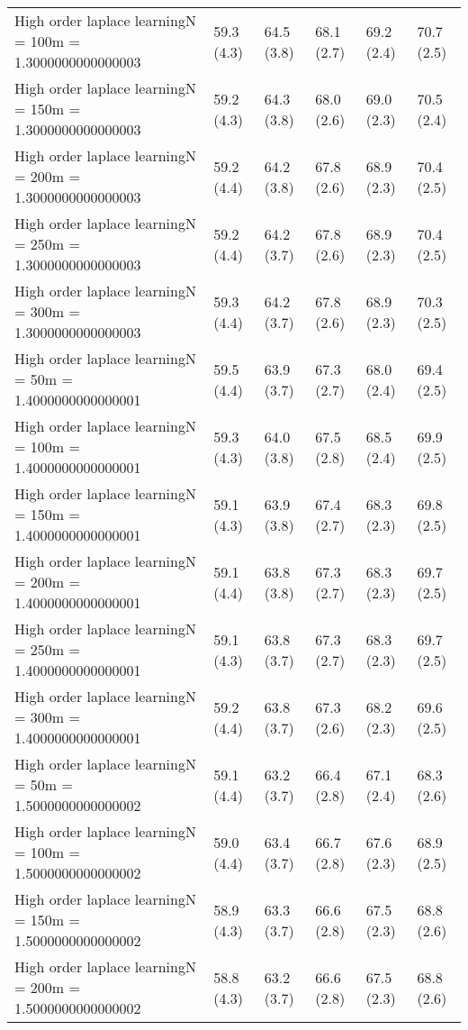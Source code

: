 \documentclass{article}
\begin{document}
\begin{table*}[t!]
\begin{center}
\begin{small}
\begin{sc}
\begin{tabular}{llllll}
High order laplace learningN = 100m = 1.3000000000000003&59.3 (4.3)      &64.5 (3.8)      &68.1 (2.7)      &69.2 (2.4)      &70.7 (2.5)      \\
High order laplace learningN = 150m = 1.3000000000000003&59.2 (4.3)      &64.3 (3.8)      &68.0 (2.6)      &69.0 (2.3)      &70.5 (2.4)      \\
High order laplace learningN = 200m = 1.3000000000000003&59.2 (4.4)      &64.2 (3.8)      &67.8 (2.6)      &68.9 (2.3)      &70.4 (2.5)      \\
High order laplace learningN = 250m = 1.3000000000000003&59.2 (4.4)      &64.2 (3.7)      &67.8 (2.6)      &68.9 (2.3)      &70.4 (2.5)      \\
High order laplace learningN = 300m = 1.3000000000000003&59.3 (4.4)      &64.2 (3.7)      &67.8 (2.6)      &68.9 (2.3)      &70.3 (2.5)      \\
High order laplace learningN = 50m = 1.4000000000000001&59.5 (4.4)      &63.9 (3.7)      &67.3 (2.7)      &68.0 (2.4)      &69.4 (2.5)      \\
High order laplace learningN = 100m = 1.4000000000000001&59.3 (4.3)      &64.0 (3.8)      &67.5 (2.8)      &68.5 (2.4)      &69.9 (2.5)      \\
High order laplace learningN = 150m = 1.4000000000000001&59.1 (4.3)      &63.9 (3.8)      &67.4 (2.7)      &68.3 (2.3)      &69.8 (2.5)      \\
High order laplace learningN = 200m = 1.4000000000000001&59.1 (4.4)      &63.8 (3.8)      &67.3 (2.7)      &68.3 (2.3)      &69.7 (2.5)      \\
High order laplace learningN = 250m = 1.4000000000000001&59.1 (4.3)      &63.8 (3.7)      &67.3 (2.7)      &68.3 (2.3)      &69.7 (2.5)      \\
High order laplace learningN = 300m = 1.4000000000000001&59.2 (4.4)      &63.8 (3.7)      &67.3 (2.6)      &68.2 (2.3)      &69.6 (2.5)      \\
High order laplace learningN = 50m = 1.5000000000000002&59.1 (4.4)      &63.2 (3.7)      &66.4 (2.8)      &67.1 (2.4)      &68.3 (2.6)      \\
High order laplace learningN = 100m = 1.5000000000000002&59.0 (4.4)      &63.4 (3.7)      &66.7 (2.8)      &67.6 (2.3)      &68.9 (2.5)      \\
High order laplace learningN = 150m = 1.5000000000000002&58.9 (4.3)      &63.3 (3.7)      &66.6 (2.8)      &67.5 (2.3)      &68.8 (2.6)      \\
High order laplace learningN = 200m = 1.5000000000000002&58.8 (4.3)      &63.2 (3.7)      &66.6 (2.8)      &67.5 (2.3)      &68.8 (2.6)      \\

\end{tabular}
\end{sc}
\end{small}
\end{center}
\end{table*}
\end{document}
